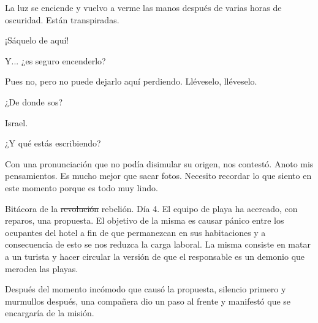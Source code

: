\documentclass[12pt,twoside,openright,a5paper]{book}
\begin{document}
La luz se enciende y vuelvo a verme las manos después de varias horas de
oscuridad. Están transpiradas.

\vspace{0.5cm}

\hrulefill\hspace{0.2cm} \decofourleft\decofourright \hspace{0.2cm} \hrulefill
\vspace{0.5cm}

¡Sáquelo de aquí!

Y... ¿es seguro encenderlo?

Pues no, pero no puede dejarlo aquí perdiendo. Lléveselo, lléveselo.

\vspace{0.5cm}

\hrulefill\hspace{0.2cm} \decofourleft\decofourright \hspace{0.2cm} \hrulefill
\vspace{0.5cm}

¿De donde sos?

Israel.

¿Y qué estás escribiendo?

Con una pronunciación que no podía disimular su origen, nos contestó. Anoto
mis pensamientos. Es mucho mejor que sacar fotos. Necesito recordar lo que
siento en este momento porque es todo muy lindo.

\vspace{0.5cm}

\hrulefill\hspace{0.2cm} \decofourleft\decofourright \hspace{0.2cm} \hrulefill
\vspace{0.5cm}

Bitácora de la \st{revolución} rebelión. Día 4. El equipo de playa ha acercado, con
reparos, una propuesta. El objetivo de la misma es causar pánico entre
los ocupantes del hotel a fin de que permanezcan en sus habitaciones y a
consecuencia de esto se nos reduzca la carga laboral. La misma consiste en
matar a un turista y hacer circular la versión de que el responsable es un
demonio que merodea las playas.

Después del momento incómodo que causó
la propuesta, silencio primero y murmullos después, una compañera dio
un paso al frente y manifestó que se encargaría de la misión.


\vspace{0.5cm}
\end{document}
